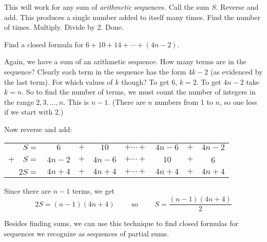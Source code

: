 \documentclass[11pt,]{book}
\theoremstyle{ptxplainnotitle}
\theoremstyle{ptxplaintitle}
\theoremstyle{ptxdefinitionnotitle}
\theoremstyle{ptxdefinitiontitle}
\theoremstyle{ptxdefinitionnotitle}
\theoremstyle{ptxdefinitiontitle}
\theoremstyle{ptxdefinitionnotitle}
\theoremstyle{ptxdefinitiontitle}
\theoremstyle{ptxdefinitiontitlenonumber}
\theoremstyle{ptxdefinitiontitlenonumber}
\numberwithin{equation}{chapter}
\newcommand{\hrulethin}  {\noalign{\hrule height 0.04em}}
\begin{document}
This will work for any sum of \emph{arithmetic} sequences. Call the sum \(S\). Reverse and add. This produces a single number added to itself many times. Find the number of times. Multiply. Divide by 2. Done.%
\begin{example}\label{example-8}
\hypertarget{p-194}{}%
Find a closed formula for \(6 + 10 + 14 + \cdots + (4n - 2)\).%
\par\smallskip%
\noindent\textbf{}\hypertarget{solution-19}{}\hypertarget{p-195}{}%
Again, we have a sum of an arithmetic sequence. How many terms are in the sequence?  Clearly each term in the sequence has the form \(4k -2\) (as evidenced by the last term). For which values of \(k\) though? To get 6, \(k = 2\). To get \(4n-2\) take \(k = n\). So to find the number of terms, we must count the number of integers in the range \(2,3,\ldots, n\). This is \(n-1\). (There are \(n\) numbers from 1 to \(n\), so one less if we start with 2.)%
\par
\hypertarget{p-196}{}%
Now reverse and add:%
\begin{sidebyside}{1}{0}{0}{0}
\begin{sbspanel}{1}
{\centering%
\begin{tabular}{rccccccc}
\(S  =\)&\(6\)&\(+\)&\(10\)&\(+ \cdots +\)&\(4n-6\)&\(+\)&\(4n-2\)\tabularnewline[0pt]
\(+ \quad S  =\)&\(4n-2\)&\(+\)&\(4n-6\)&\(+ \cdots +\)&\(10\)&\(+\)&6\tabularnewline\hrulethin
\(2S  =\)&\(4n+4\)&\(+\)&\(4n+4\)&\(+ \cdots +\)&\(4n+4\)&\(+\)&\(4n+4\)
\end{tabular}
\par}
\end{sbspanel}
\end{sidebyside}
\par
\hypertarget{p-197}{}%
Since there are \(n-1\) terms, we get%
\begin{equation*}
2S = (n-1)(4n+4)\qquad \mbox{ so } \qquad S = \frac{(n-1)(4n+4)}{2}
\end{equation*}
%
\end{example}
\hypertarget{p-198}{}%
Besides finding sums, we can use this technique to find closed formulas for sequences we recognize as sequences of partial sums.%
\end{document}
